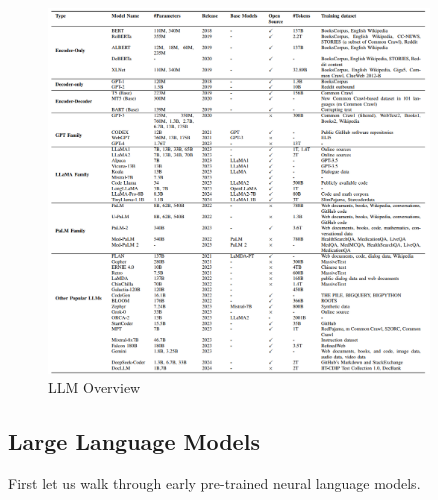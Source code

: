 \documentclass[10pt]{elegantbook}
\begin{document}
\begin{figure}[htbp]
    \centering
    \includegraphics[width=0.90\textwidth]{image/LLM_overview.png}
    \caption{LLM Overview}
    \label{fig:LLM_overview}
\end{figure}

\subsection{Large Language Models}
First let us walk through early pre-trained neural language models. 
\end{document}
